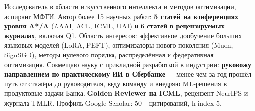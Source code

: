 
\begin{cvparagraph}

Исследователь в области искусственного интеллекта и методов оптимизации, аспирант МФТИ. Автор более 15 научных работ: \textbf{5 статей на конференциях уровня A*/A} (AAAI, ACL, ICML, UAI) и \textbf{6 статей в рецензируемых журналах}, включая Q1. Область интересов: эффективное дообучение больших языковых моделей (LoRA, PEFT), оптимизаторы нового поколения (Muon, SignSGD), методы нулевого порядка, распределённая и федеративная оптимизация. Совмещаю науку с прикладной разработкой в индустрии: \textbf{руковожу направлением по практическому ИИ в Сбербанке} — менее чем за год прошёл путь от стажёра до руководителя, веду команду и внедряю ML-решения в продуктовые задачи Банка. \textbf{Golden Reviewer на ICML}, рецензент NeurIPS и журнала TMLR. Профиль Google Scholar: 50+ цитирований, h-index 5.

\end{cvparagraph}
